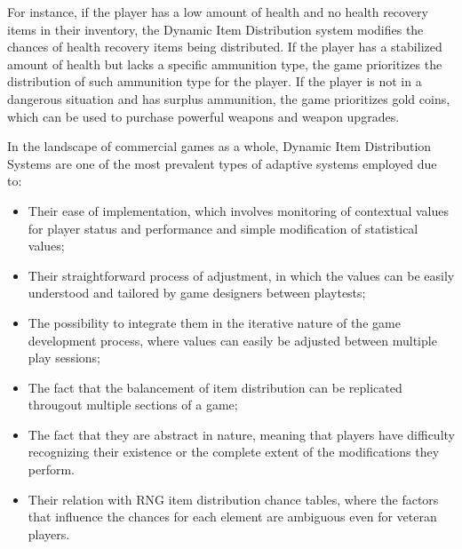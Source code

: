 For instance, if the player has a low amount of health and no health recovery items in their inventory, the Dynamic Item Distribution system modifies the chances of health recovery items being distributed. If the player has a stabilized amount of health but lacks a specific ammunition type, the game prioritizes the distribution of such ammunition type for the player. If the player is not in a dangerous situation and has surplus ammunition, the game prioritizes gold coins, which can be used to purchase powerful weapons and weapon upgrades. 


In the landscape of commercial games as a whole, Dynamic Item Distribution Systems are one of the most prevalent types of adaptive systems employed due to:
\begin{itemize} 
    \item{Their ease of implementation, which involves monitoring of contextual values for player status and performance and simple modification of statistical values;}
    \item{Their straightforward process of adjustment, in which the values can be easily understood and tailored by game designers between playtests;}
    \item{The possibility to integrate them in the iterative nature of the game development process, where values can easily be adjusted between multiple play sessions;}
    \item{The fact that the balancement of item distribution can be replicated througout multiple sections of a game;}
    \item{The fact that they are abstract in nature, meaning that players have difficulty recognizing their existence or the complete extent of the modifications they perform.}
    \item{Their relation with RNG item distribution chance tables, where the factors that influence the chances for each element are ambiguous even for veteran players.}
\end{itemize}

